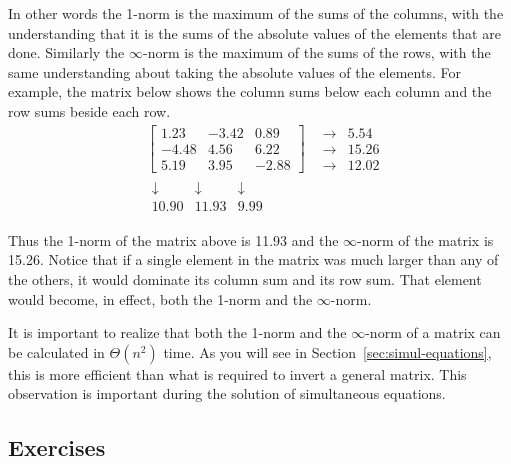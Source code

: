 In other words the 1-norm is the maximum of the sums of the columns, with the understanding that
it is the sums of the absolute values of the elements that are done. Similarly the $\infty$-norm
is the maximum of the sums of the rows, with the same understanding about taking the absolute
values of the elements. For example, the matrix below shows the column sums below each column
and the row sums beside each row.
\begin{eqnarray*}   %
&
\left[
\begin{array}{rrr}
 1.23 & -3.42 &  0.89 \\
-4.48 &  4.56 &  6.22 \\
 5.19 &  3.95 & -2.88
\end{array}
    \right] &
\left.
\begin{array}{rr}
\rightarrow &  5.54 \\
\rightarrow & 15.26 \\
\rightarrow & 12.02
\end{array}
\right.\\
&
\begin{array}{rrr}
\downarrow & \downarrow & \downarrow \\
10.90 & 11.93 & 9.99
\end{array} &
\end{eqnarray*}

Thus the 1-norm of the matrix above is 11.93 and the $\infty$-norm of the matrix is 15.26.
Notice that if a single element in the matrix was much larger than any of the others, it would
dominate its column sum and its row sum. That element would become, in effect, both the 1-norm
and the $\infty$-norm.

It is important to realize that both the 1-norm and the $\infty$-norm of a matrix can be
calculated in $\Theta(n^2)$ time. As you will see in Section~\ref{sec:simul-equations}, this is
more efficient than what is required to invert a general matrix. This observation is important
during the solution of simultaneous equations.

\subsection*{Exercises}

